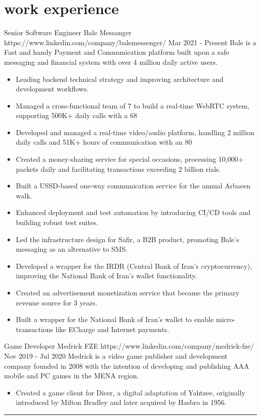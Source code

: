 \documentclass[a4paper]{article}
\begin{document}
\begin{minipage}[t]{0.65\textwidth}
  \section{work experience}
  {
    \expheadingwithlink
      {Senior Software Engineer}
      {Bale Messanger}
      {https://www.linkedin.com/company/balemessenger/}
      {Mar 2021 - Present}
      {Bale is a Fast and handy Payment and Communication platform built upon a safe messaging and financial system with over 4 million daily active users.}
    \begin{itemize}[leftmargin=.5cm, itemsep=1pt]
      \item \justifying\small Leading backend technical strategy and improving architecture and development workflows.
      \item \justifying\small Managed a cross-functional team of 7 to build a real-time WebRTC system, supporting 500K+ daily calls with a 68%
      \item \justifying\small Developed and managed a real-time video/audio platform, handling 2 million daily calls and 51K+ hours of communication with an 80%
      \item \justifying\small Created a money-sharing service for special occasions, processing 10,000+ packets daily and facilitating transactions exceeding 2 billion rials.
      \item \justifying\small Built a USSD-based one-way communication service for the annual Arbaeen walk.
      \item \justifying\small Enhanced deployment and test automation by introducing CI/CD tools and building robust test suites.
      \item \justifying\small Led the infrastructure design for Saﬁr, a B2B product, promoting Bale's messaging as an alternative to SMS.
      \item \justifying\small Developed a wrapper for the IRDR (Central Bank of Iran's cryptocurrency), improving the National Bank of Iran’s wallet functionality.
      \item \justifying\small Created an advertisement monetization service that became the primary revenue source for 3 years.
      \item \justifying\small Built a wrapper for the National Bank of Iran’s wallet to enable micro-transactions like ECharge and Internet payments.
  \end{itemize}

  \expheadingwithlink
    {Game Developer}
    {Medrick FZE}
    {https://www.linkedin.com/company/medrick-fze/}
    {Nov 2019 - Jul 2020}
    {Medrick is a video game publisher and development company founded in 2008 with the intention of developing and publishing AAA mobile and PC games in the MENA region.}

    \begin{itemize}[leftmargin=.5cm]
      \item \justifying\small Created a game client for Dicer, a digital adaptation of Yahtzee, originally introduced by Milton Bradley and later acquired by Hasbro in 1956.
    \end{itemize}
  }
\end{minipage}

\vspace{-1pt}
\rule{\textwidth}{1pt}
\end{document}
